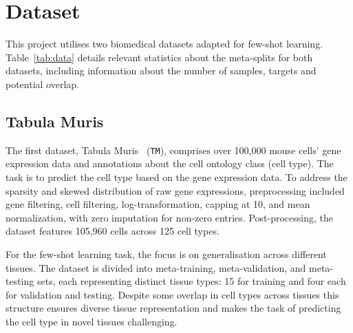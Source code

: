 \section{Dataset}

This project utilises two biomedical datasets adapted for few-shot learning. Table~\ref{tab:data} details relevant statistics about the meta-splits for both datasets, including information about the number of samples, targets and potential overlap.


\subsection{Tabula Muris}


The first dataset, Tabula Muris~\cite{tabula2018} (\texttt{TM}), comprises over 100,000 mouse cells' gene expression data and annotations about the cell ontology class (cell type). The task is to predict the cell type based on the gene expression data. To address the sparsity and skewed distribution of raw gene expressions, preprocessing included gene filtering, cell filtering, log-transformation, capping at 10, and mean normalization, with zero imputation for non-zero entries. Post-processing, the dataset features 105,960 cells across 125 cell types.

For the few-shot learning task, the focus is on generalisation across different tissues. The dataset is divided into meta-training, meta-validation, and meta-testing sets, each representing distinct tissue types: 15 for training and four each for validation and testing. Despite some overlap in cell types across tissues this structure ensures diverse tissue representation and makes the task of predicting the cell type in novel tissues challenging.


